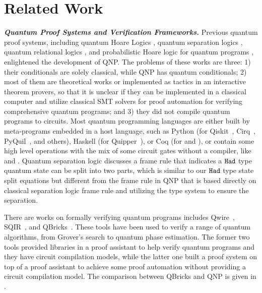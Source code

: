 \section{Related Work}
\label{sec:related}

\noindent\textbf{\textit{Quantum Proof Systems and Verification Frameworks.}}
Previous quantum proof systems, including quantum Hoare Logics \cite{qhoare,qhoreusage,10.1145/3456877,10.1007/s00165-018-0465-3},
quantum separation logics \cite{qseplocal,qsepa}, quantum relational logics \cite{relationlogic,10.1145/3290346}, and probabilistic Hoare logic for quantum programs \cite{10.1007/978-3-642-10622-4_7}, enlightened the development of QNP. The problems of these works are three: 1) their conditionals are solely classical, while QNP has quantum conditionals; 2) most of them are theoretical works or implemented as tactics in an interactive theorem provers, so that it is unclear if they can be implemented in a classical computer and utilize classical SMT solvers for proof automation for verifying comprehensive quantum programs; and 3) they did not compile quantum programs to circuits.  Most quantum programming languages are either built by meta-programs embedded in a host language, such as Python (for Qiskit~\cite{Qiskit}, Cirq~\cite{cirq}, PyQuil~\cite{PyQuil}, and others), Haskell (for Quipper~\cite{Green2013}), or Coq (for \sqir and \voqc \cite{VOQC}), or contain some high level operations with the mix of some circuit gates without a compiler, like \cite{sliqlanguage} and \cite{qsharp}.
Quantum separation logic \cite{qseplocal} discusses a frame rule that indicates a $\texttt{Had}$ type quantum state can be split into two parts, which is similar to our $\texttt{Had}$ type state split equations but different from the frame rule in QNP that is based directly on classical separation logic frame rule and utilizing the \qafny type system to ensure the separation. 

There are works on formally verifying quantum programs includes Qwire~\cite{RandThesis}, SQIR~\cite{PQPC}, and QBricks~\cite{qbricks}. These tools have been used to verify a range of quantum algorithms, from Grover's search to quantum phase estimation.
The former two tools provided libraries in a proof assistant to help verify quantum programs and they have circuit compilation models, while the latter one built a proof system on top of a proof assistant to achieve some proof automation without providing a circuit compilation model. The comparison between QBricks and QNP is given in .

